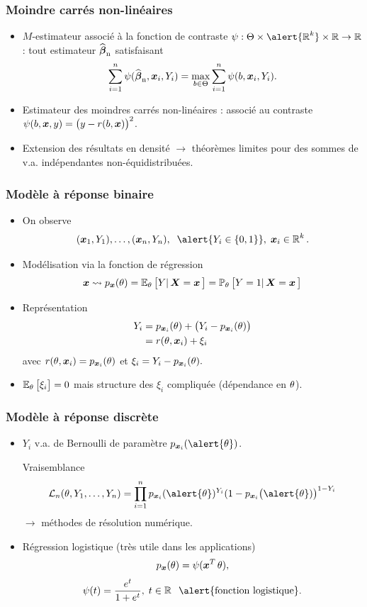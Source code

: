 \begin{frame}
\frametitle{Moindre carrés non-linéaires}
\begin{df}
\begin{itemize}
\item $M$-estimateur associé à la \alert{fonction de contraste} $\psi:\Theta \times \alert{\R^k}\times \R\rightarrow \R$ : tout estimateur $\operatorname{\widehat{\boldsymbol{\beta}}_n}$ satisfaisant
$$\sum_{i = 1}^n \psi(\operatorname{\widehat{\boldsymbol{\beta}}_n}, \operatorname{\boldsymbol{x}}_i, Y_i) = \max_{b \in \Theta} \sum_{i = 1}^n \psi(b,\operatorname{\boldsymbol{x}}_i,Y_i).$$
\item Estimateur des \alert{moindres carrés non-linéaires} : associé au contraste $\psi(b,\operatorname{\boldsymbol{x}},y) = \big(y-r(b,\operatorname{\boldsymbol{x}})\big)^2$.
\end{itemize}
\end{df}
\begin{itemize}
\item \alert{Extension} des résultats en densité
$\rightarrow$ théorèmes limites pour des sommes de v.a.
indépendantes \alert{ non-équidistribuées}.
\end{itemize}
\end{frame}

\begin{frame}
\frametitle{Modèle à réponse binaire}
\begin{itemize}
\item On observe
$$(\bx_1,Y_1),\ldots, (\bx_n,Y_n),\;\;\alert{Y_i \in \{0,1\}},\;\bx_i \in \R^k.$$
\item Modélisation \alert{via la fonction de régression}
$$\operatorname{\boldsymbol{x}} \leadsto p_{\operatorname{\boldsymbol{x}}}(\theta) = \operatorname{{\mathbb E}}_\theta\big[Y|\operatorname{\boldsymbol{X}} = \operatorname{\boldsymbol{x}}\big] = \operatorname{{\mathbb P}}_\theta\big[Y = 1|\operatorname{\boldsymbol{X}}=\operatorname{\boldsymbol{x}}\big]$$
\item \alert{Représentation}
\begin{align*}
Y_i & =  p_{\operatorname{\boldsymbol{x}}_i}(\theta)+\big(Y_i-p_{\operatorname{\boldsymbol{x}}_i}(\theta)\big) \\
& = r(\theta,\operatorname{\boldsymbol{x}}_i)+\xi_i
\end{align*}
avec
$r(\theta, \operatorname{\boldsymbol{x}}_i) = p_{\operatorname{\boldsymbol{x}}_i}(\theta)$ et $\xi_i = Y_i-p_{\operatorname{\boldsymbol{x}}_i}(\theta).$
\item $\operatorname{{\mathbb E}}_\theta\big[\xi_i\big]=0$ mais structure des $\xi_i$ \alert{compliquée} (dépendance en $\theta$).
\end{itemize}
\end{frame}

\begin{frame}
\frametitle{Modèle à réponse discrète}
\begin{itemize}
\item $Y_i $ v.a. de Bernoulli de paramètre $p_{\bx_i}(\alert{\truetheta})$.

\alert{ Vraisemblance}
$${\mathcal L}_n(\truetheta,Y_1,\ldots, Y_n) = \prod_{i = 1}^n p_{\bx_i}(\alert{\truetheta})^{Y_i}(1-p_{\bx_i}\big(\alert{\truetheta})\big)^{1-Y_i}$$
$\rightarrow$ méthodes de résolution numérique.
\item \alert{ Régression logistique} (très utile dans les applications)
$$p_{\operatorname{\boldsymbol{x}}}(\theta) = \psi(\operatorname{\boldsymbol{x}}^T\theta),$$
$$\psi(t)=\frac{e^t}{1+e^t},\;t \in \R\;\;\alert{{\text{fonction logistique}}}.$$
\end{itemize}
\end{frame}

